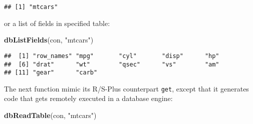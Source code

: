 \documentclass[]{book}
\newenvironment{Shaded}{\begin{snugshade}}{\end{snugshade}}
\newcommand{\KeywordTok}[1]{\textcolor[rgb]{0.13,0.29,0.53}{\textbf{{#1}}}}
\newcommand{\StringTok}[1]{\textcolor[rgb]{0.31,0.60,0.02}{{#1}}}
\newcommand{\NormalTok}[1]{{#1}}
\begin{document}
\begin{verbatim}
## [1] "mtcars"
\end{verbatim}

or a list of fields in specified table:

\begin{Shaded}
\begin{Highlighting}[]
\KeywordTok{dbListFields}\NormalTok{(con, }\StringTok{"mtcars"}\NormalTok{)}
\end{Highlighting}
\end{Shaded}

\begin{verbatim}
##  [1] "row_names" "mpg"       "cyl"       "disp"      "hp"       
##  [6] "drat"      "wt"        "qsec"      "vs"        "am"       
## [11] "gear"      "carb"
\end{verbatim}

The next function mimic its R/S-Plus counterpart \texttt{get}, except
that it generates code that gets remotely executed in a database engine:

\begin{Shaded}
\begin{Highlighting}[]
\KeywordTok{dbReadTable}\NormalTok{(con, }\StringTok{"mtcars"}\NormalTok{)}
\end{Highlighting}
\end{Shaded}
\end{document}

